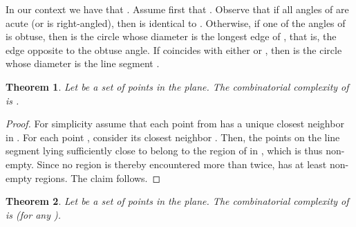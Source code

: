 \documentclass[10pt, conference, compsocconf]{IEEEtran}
\newtheorem{theorem}{Theorem}
\begin{document}
In our context we have that .
Assume first that .
Observe that if all angles of  are acute (or 
is right-angled), then  is identical to .
Otherwise, if one of the angles of  is obtuse, then
 is the circle whose diameter is the longest edge of
, that is, the edge opposite to the obtuse angle.
If  coincides with either  or , then  is the circle
whose diameter is the line segment .

\begin{theorem}
   Let  be a set of  points in the plane.
   The combinatorial complexity of  is .
\end{theorem}

\begin{proof}
   For simplicity assume that each point from  has a unique
   closest neighbor in .
   For each point , consider its closest neighbor .
   Then, the points on the line segment  lying sufficiently close to
    belong to the region of  in , which is thus
   non-empty.  Since no region is thereby encountered more than twice,
    has at least  non-empty regions.
   The claim follows.
\end{proof}

\begin{theorem}
   Let  be a set of  points in the plane.
   The combinatorial complexity of  is 
   (for any ).
\end{theorem}
\end{document}
